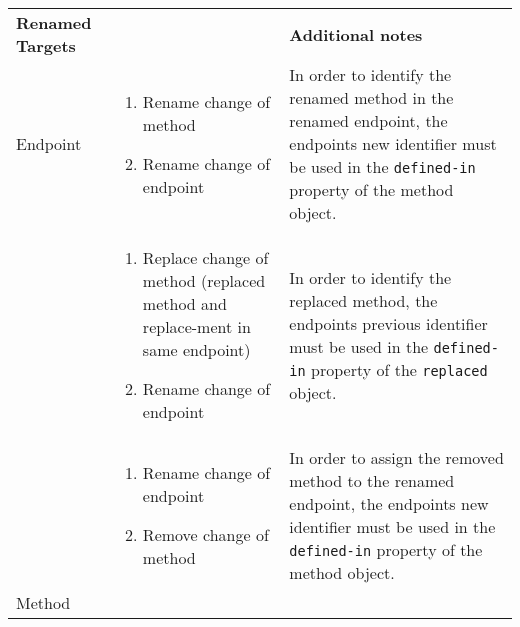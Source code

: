 	\begin{longtable}{@{}p{}>{\raggedright\arraybackslash}p{}p{}@{}}
		\toprule
		\multirow{2}{0.34\textwidth}{\textbf{Renamed \newline Targets}} & \multirow{2}{0.34\textwidth}{\textbf{Order of changes}} & \multirow{2}{0.34\textwidth}{\textbf{Additional notes}} \\ 
		  &  & \\ \midrule \endhead
		Endpoint                   &      \vspace{-2em}\begin{enumerate}[leftmargin=*]
			\setlength\itemsep{0.05em}
			\item Rename change of method
			\item Rename change of endpoint
		\end{enumerate}           &    In order to identify the renamed method in the renamed endpoint,  the endpoints new identifier must be used in the \texttt{defined-in} property of the method object.      \\
		                  &      \vspace{-2em}\begin{enumerate}[leftmargin=*]
		\setlength\itemsep{0.05em}
		\item Replace change of method (replaced method and re\-place-\newline ment in same endpoint)
		\item Rename change of endpoint
	\end{enumerate}           &     In order to identify the replaced method, the endpoints previous identifier must be used in the \texttt{defined-in} property of the \texttt{replaced} object.      \\
		                  &      \vspace{-2em}\begin{enumerate}[leftmargin=*]
	\setlength\itemsep{0.05em}
	\item Rename change of endpoint
	\item Remove change of method
\end{enumerate}           &     In order to assign the removed method to the renamed endpoint, the endpoints new identifier must be used in the \texttt{defined-in} property of the method object.       \\ 
	Method                   &      \vspace{-2em}\begin{enumerate}[leftmargin=*]
		\setlength\itemsep{0.05em}

\end{enumerate}
\end{longtable}
